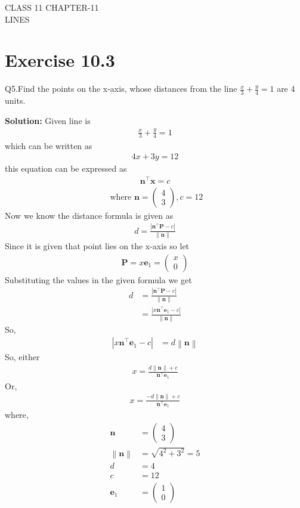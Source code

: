 \documentclass[12pt]{article}
\providecommand{\norm}[1]{\left\lVert#1\right\rVert}
\newcommand{\solution}{\noindent \textbf{Solution: }}
\newcommand{\myvec}[1]{\ensuremath{\begin{pmatrix}#1\end{pmatrix}}}
\providecommand{\abs}[1]{\left\vert#1\right\vert}
\let\vec\mathbf
\begin{document}
\begin{center}
\textbf\large{CLASS 11 CHAPTER-11 \\ LINES}

\end{center}
\section*{Exercise 10.3}

Q5.Find the points on the x-axis, whose distances from the line $\frac{x}{3}+\frac{y}{4}=1$ are 4 units.

\solution
Given line is 
\begin{align}
	\frac{x}{3}+\frac{y}{4}=1
\end{align}
which can be written as
\begin{align}
	4x+3y=12
\end{align}
this equation can be expressed as 
\begin{align}
	\vec{n}^{\top}\vec{x}=c
\end{align}
\begin{align}
	\text{ where }
		\vec{n} = \myvec{4\\3} , c = 12
\end{align}
Now we know the distance formula is given as
\begin{align}
	d = \frac{\abs{\vec{n}^\top\vec{P}-c}}{\norm{\vec{n}}}
\end{align}
Since it is given that point lies on the x-axis so let
\begin{align}
	\vec{P} = x\vec{e}_{1} = \myvec{x\\0}
\end{align}
Substituting the values in the given formula we get
\begin{align}
	d &= \frac{\abs{\vec{n}^\top\vec{P}-c}}{\norm{\vec{n}}}\\
	  &= \frac{\abs{x\vec{n}^\top\vec{e}_{1}-c}}{\norm{\vec{n}}}
\end{align}
So,
\begin{align}
	\abs{x\vec{n}^\top\vec{e}_{1}-c} &= d\norm{\vec{n}}
\end{align}
So, either
\begin{align}
	x = \frac{d\norm{\vec{n}}+c}{\vec{n}^\top\vec{e}_{1}}
\end{align}
Or,
\begin{align}
	x = \frac{-d\norm{\vec{n}}+c}{\vec{n}^\top\vec{e}_{1}}
\end{align}
where,
\begin{align}
	\vec{n} &= \myvec{4\\3}\\
	\norm{\vec{n}} &= \sqrt{4^2+3^2} = 5\\
	d &= 4\\
	c &= 12\\
	\vec{e}_{1} &= \myvec{1\\0}
\end{align}
\end{document}
